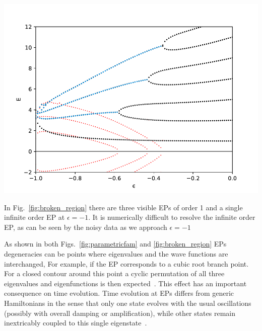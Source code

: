 \documentclass[12pt, a4paper]{report}
\newenvironment{Figure}
    {\par\medskip\noindent\minipage{\linewidth}}
    {\endminipage\par\medskip}
\begin{document}
\begin{Figure}
\centering
\includegraphics[width=0.6\linewidth]{broken_region.pdf}
\label{fig:broken_region}
\end{Figure}
In Fig.~\ref{fig:broken_region} there are three visible EPs of order 1 and a single infinite order EP at $\epsilon=-1$. 
It is numerically difficult to resolve the infinite order EP, as can be seen by the noisy data as we approach $\epsilon=-1$

As shown in both Figs.~\ref{fig:parametricfam} and \ref{fig:broken_region} EPs degeneracies can be points where eigenvalues and the wave functions are interchanged, For example, if the EP corresponds to a cubic root branch point. For a closed contour around this point a cyclic permutation of all three eigenvalues and eigenfunctions is then expected~\cite{Cartarius}. This effect has an important consequence on time evolution. Time evolution at EPs differs from generic Hamiltonians in the sense that only one state evolves with the usual oscillations (possibly with overall damping or amplification), while other states remain inextricably coupled to this single eigenstate~\cite{Bossart}. 
\end{document}
